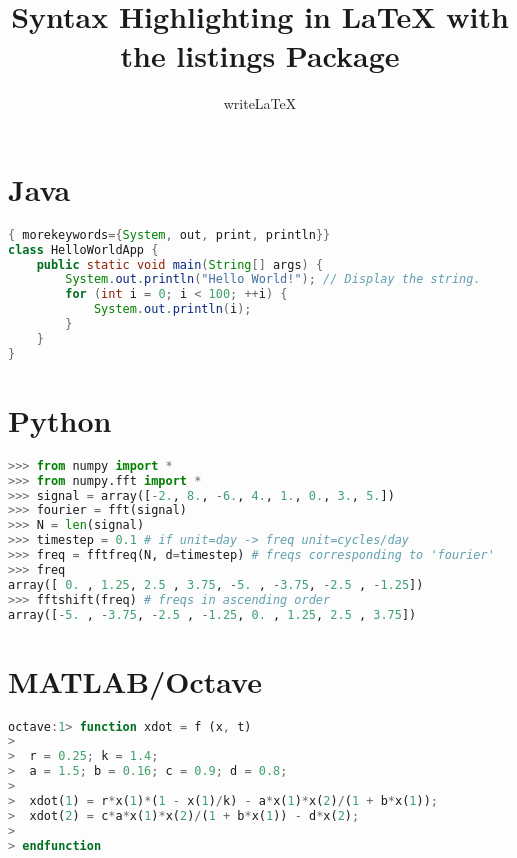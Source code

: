 \documentclass[12pt]{article}
\title{Syntax Highlighting in LaTeX with the listings Package}
\author{writeLaTeX}
\begin{document}
\maketitle

\section{Java}
\begin{lstlisting}[language=java]{ morekeywords={System, out, print, println}}
class HelloWorldApp {
    public static void main(String[] args) {
        System.out.println("Hello World!"); // Display the string.
        for (int i = 0; i < 100; ++i) {
            System.out.println(i);
        }
    }
}
\end{lstlisting}

\section{Python}
\begin{lstlisting}[language=python]
>>> from numpy import *
>>> from numpy.fft import *
>>> signal = array([-2., 8., -6., 4., 1., 0., 3., 5.])
>>> fourier = fft(signal)
>>> N = len(signal)
>>> timestep = 0.1 # if unit=day -> freq unit=cycles/day
>>> freq = fftfreq(N, d=timestep) # freqs corresponding to 'fourier'
>>> freq
array([ 0. , 1.25, 2.5 , 3.75, -5. , -3.75, -2.5 , -1.25])
>>> fftshift(freq) # freqs in ascending order
array([-5. , -3.75, -2.5 , -1.25, 0. , 1.25, 2.5 , 3.75])
\end{lstlisting}

\section{MATLAB/Octave}
\begin{lstlisting}[language=octave]
octave:1> function xdot = f (x, t)
>
>  r = 0.25; k = 1.4;
>  a = 1.5; b = 0.16; c = 0.9; d = 0.8;
>
>  xdot(1) = r*x(1)*(1 - x(1)/k) - a*x(1)*x(2)/(1 + b*x(1));
>  xdot(2) = c*a*x(1)*x(2)/(1 + b*x(1)) - d*x(2);
>
> endfunction
\end{lstlisting}
\end{document}
